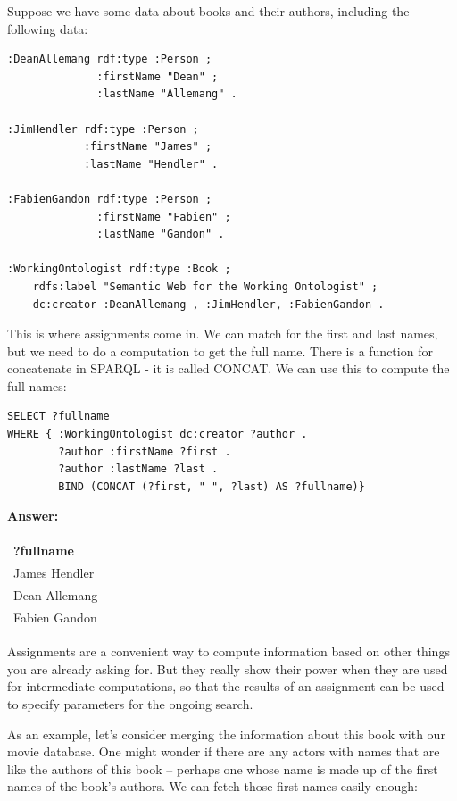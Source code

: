 Suppose we have some data about books and their authors, including the
following data:

\begin{lstlisting}
:DeanAllemang rdf:type :Person ;
              :firstName "Dean" ;
              :lastName "Allemang" .

:JimHendler rdf:type :Person ;
            :firstName "James" ;
            :lastName "Hendler" .

:FabienGandon rdf:type :Person ;
              :firstName "Fabien" ;
              :lastName "Gandon" .

:WorkingOntologist rdf:type :Book ;
    rdfs:label "Semantic Web for the Working Ontologist" ;
    dc:creator :DeanAllemang , :JimHendler, :FabienGandon .
\end{lstlisting}


This is where assignments come in. We can match for the first and last
names, but we need to do a computation to get the full name. There is a
function for concatenate in SPARQL - it is called CONCAT. We
can use this to compute the full names:


\begin{lstlisting}
SELECT ?fullname
WHERE { :WorkingOntologist dc:creator ?author .
        ?author :firstName ?first .
        ?author :lastName ?last . 
        BIND (CONCAT (?first, " ", ?last) AS ?fullname)}
\end{lstlisting}


\textbf{\textbf{Answer:}}

\begin{tabular}{|l|}
\hline
?fullname\\
\hline
James Hendler\\
Dean Allemang\\
Fabien Gandon\\
\hline
\end{tabular}

Assignments are a convenient way to compute information based on other
things you are already asking for. But they really show their power when
they are used for intermediate computations, so that the results of an
assignment can be used to specify parameters for the ongoing search.

As an example, let's consider merging the information about this book
with our movie database. One might wonder if there are any actors with
names that are like the authors of this book -- perhaps one whose name
is made up of the first names of the book's authors. We can fetch those
first names easily enough:

